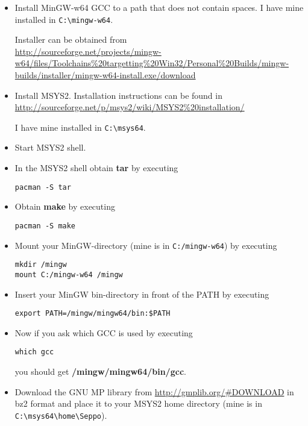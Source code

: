 \begin{itemize}

\item
Install MinGW-w64 GCC to a path that does not contain spaces.
I have mine installed in \verb|C:\mingw-w64|.

Installer can be obtained from\\
\url{http://sourceforge.net/projects/mingw-w64/files/Toolchains%20targetting%20Win32/Personal%20Builds/mingw-builds/installer/mingw-w64-install.exe/download}

\item
Install MSYS2.
Installation instructions can be found in\\
\url{http://sourceforge.net/p/msys2/wiki/MSYS2%20installation/}

I have mine installed in \verb|C:\msys64|.

\item
Start MSYS2 shell.

\item
In the MSYS2 shell obtain \textbf{tar} by executing
\begin{verbatim}
pacman -S tar
\end{verbatim}

\item
Obtain \textbf{make} by executing
\begin{verbatim}
pacman -S make
\end{verbatim}

\item
Mount your MinGW-directory (mine is in \verb|C:/mingw-w64|) by executing
\begin{verbatim}
mkdir /mingw
mount C:/mingw-w64 /mingw
\end{verbatim}

\item
Insert your MinGW bin-directory in front of the PATH by executing
\begin{verbatim}
export PATH=/mingw/mingw64/bin:$PATH
\end{verbatim}

\item
Now if you ask which GCC is used by executing
\begin{verbatim}
which gcc
\end{verbatim}
you should get \textbf{/mingw/mingw64/bin/gcc}.

\item
Download the GNU MP library from \url{http://gmplib.org/#DOWNLOAD} in bz2 format
and place it to your MSYS2 home directory (mine is in \verb|C:\msys64\home\Seppo|).


\end{itemize}
